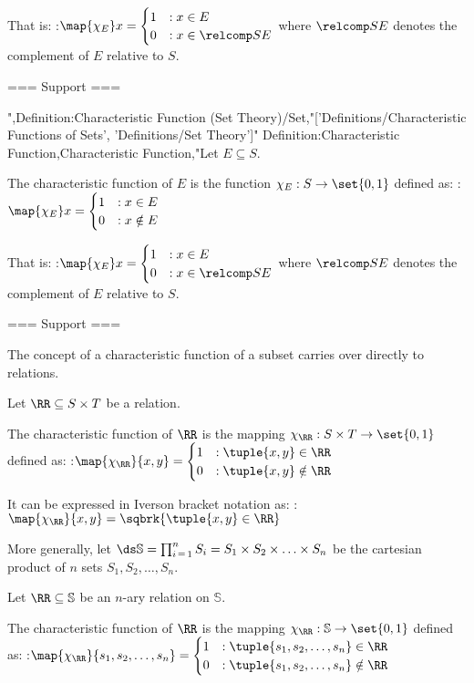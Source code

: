 That is:
:$\map {\chi_E} x = \begin {cases} 1 & : x \in E  \\ 0 & : x \in \relcomp S E \end {cases}$
where $\relcomp S E$ denotes the complement of $E$ relative to $S$.


=== Support ===

",Definition:Characteristic Function (Set Theory)/Set,"['Definitions/Characteristic Functions of Sets', 'Definitions/Set Theory']"
Definition:Characteristic Function,Characteristic Function,"Let $E \subseteq S$.

The characteristic function of $E$ is the function $\chi_E: S \to \set {0, 1}$ defined as:
:$\map {\chi_E} x = \begin {cases} 1 & : x \in E  \\  0 & : x \notin E \end {cases}$

That is:
:$\map {\chi_E} x = \begin {cases} 1 & : x \in E  \\ 0 & : x \in \relcomp S E \end {cases}$
where $\relcomp S E$ denotes the complement of $E$ relative to $S$.


=== Support ===

The concept of a characteristic function of a subset carries over directly to relations.


Let $\RR \subseteq S \times T$ be a relation.

The characteristic function of $\RR$ is the mapping $\chi_\RR: S \times T \to \set {0, 1}$ defined as:
:$\map {\chi_\RR} {x, y} = \begin {cases} 1 & : \tuple {x, y} \in \RR \\ 0 & : \tuple {x, y} \notin \RR \end{cases}$


It can be expressed in Iverson bracket notation as:
:$\map {\chi_\RR} {x, y} = \sqbrk {\tuple {x, y} \in \RR}$


More generally, let $\ds \mathbb S = \prod_{i \mathop = 1}^n S_i = S_1 \times S_2 \times \ldots \times S_n$ be the cartesian product of $n$ sets $S_1, S_2, \ldots, S_n$.

Let $\RR \subseteq \mathbb S$ be an $n$-ary relation on $\mathbb S$.

The characteristic function of $\RR$ is the mapping $\chi_\RR: \mathbb S \to \set {0, 1}$ defined as:
:$\map {\chi_\RR} {s_1, s_2, \ldots, s_n} = \begin {cases} 1 & : \tuple {s_1, s_2, \ldots, s_n} \in \RR \\ 0 & : \tuple {s_1, s_2, \ldots, s_n} \notin \RR \end {cases}$


